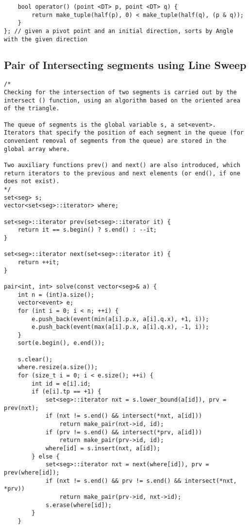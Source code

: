 \documentclass[10pt,a4paper,onesided]{article}
\begin{document}
\begin{multicols*}{3}
\begin{lstlisting}
    bool operator() (point <DT> p, point <DT> q) {
        return make_tuple(half(p), 0) < make_tuple(half(q), (p & q));
    }
}; // given a pivot point and an initial direction, sorts by Angle with the given direction
\end{lstlisting}
\subsection{Pair of Intersecting segments using Line Sweep}
\begin{lstlisting}
/*
Checking for the intersection of two segments is carried out by the intersect () function, using an algorithm based on the oriented area of the triangle.

The queue of segments is the global variable s, a set<event>. Iterators that specify the position of each segment in the queue (for convenient removal of segments from the queue) are stored in the global array where.

Two auxiliary functions prev() and next() are also introduced, which return iterators to the previous and next elements (or end(), if one does not exist).
*/
set<seg> s;
vector<set<seg>::iterator> where;

set<seg>::iterator prev(set<seg>::iterator it) {
    return it == s.begin() ? s.end() : --it;
}

set<seg>::iterator next(set<seg>::iterator it) {
    return ++it;
}

pair<int, int> solve(const vector<seg>& a) {
    int n = (int)a.size();
    vector<event> e;
    for (int i = 0; i < n; ++i) {
        e.push_back(event(min(a[i].p.x, a[i].q.x), +1, i));
        e.push_back(event(max(a[i].p.x, a[i].q.x), -1, i));
    }
    sort(e.begin(), e.end());

    s.clear();
    where.resize(a.size());
    for (size_t i = 0; i < e.size(); ++i) {
        int id = e[i].id;
        if (e[i].tp == +1) {
            set<seg>::iterator nxt = s.lower_bound(a[id]), prv = prev(nxt);
            if (nxt != s.end() && intersect(*nxt, a[id]))
                return make_pair(nxt->id, id);
            if (prv != s.end() && intersect(*prv, a[id]))
                return make_pair(prv->id, id);
            where[id] = s.insert(nxt, a[id]);
        } else {
            set<seg>::iterator nxt = next(where[id]), prv = prev(where[id]);
            if (nxt != s.end() && prv != s.end() && intersect(*nxt, *prv))
                return make_pair(prv->id, nxt->id);
            s.erase(where[id]);
        }
    }


\end{lstlisting}
\end{multicols*}
\end{document}
